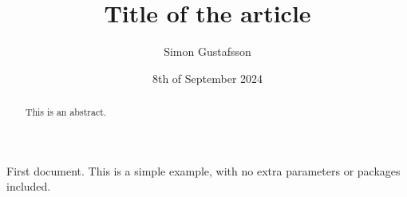 \documentclass{article}
\title{Title of the article}
\author{Simon Gustafsson}
\date{8th of September 2024}
\begin{document}
\maketitle

\begin{abstract}This is an abstract.\end{abstract}
First document. This is a simple example, with no extra parameters or packages included.
\end{document}
